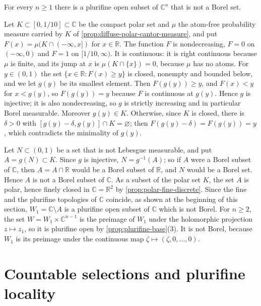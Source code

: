 \begin{example}\label{ex:non-borel-plurifine-open}
For every $n\ge1$ there is a plurifine open subset of $\mathbb C^n$ that is not a Borel set.

Let $K\subset[0,1/10]\subset\mathbb C$ be the compact polar set and $\mu$ the atom-free probability measure carried by $K$ of \cref{prop:diffuse-polar-cantor-measure}, and put $F(x)=\mu(K\cap(-\infty,x])$ for $x\in\mathbb R$. The function $F$ is nondecreasing, $F=0$ on $(-\infty,0)$ and $F=1$ on $[1/10,\infty)$. It is continuous: it is right continuous because $\mu$ is finite, and its jump at $x$ is $\mu(K\cap\{x\})=0$, because $\mu$ has no atoms. For $y\in(0,1)$ the set $\{x\in\mathbb R:F(x)\ge y\}$ is closed, nonempty and bounded below, and we let $g(y)$ be its smallest element. Then $F(g(y))\ge y$, and $F(x)<y$ for $x<g(y)$, so $F(g(y))=y$ because $F$ is continuous at $g(y)$. Hence $g$ is injective; it is also nondecreasing, so $g$ is strictly increasing and in particular Borel measurable. Moreover $g(y)\in K$. Otherwise, since $K$ is closed, there is $\delta>0$ with $[g(y)-\delta,g(y)]\cap K=\varnothing$; then $F(g(y)-\delta)=F(g(y))=y$, which contradicts the minimality of $g(y)$.

Let $N\subset(0,1)$ be a set that is not Lebesgue measurable, and put $A=g(N)\subset K$. Since $g$ is injective, $N=g^{-1}(A)$; so if $A$ were a Borel subset of $\mathbb C$, then $A=A\cap\mathbb R$ would be a Borel subset of $\mathbb R$, and $N$ would be a Borel set. Hence $A$ is not a Borel subset of $\mathbb C$. As a subset of the polar set $K$, the set $A$ is polar, hence finely closed in $\mathbb C=\mathbb R^2$ by \cref{prop:polar-fine-discrete}. Since the fine and the plurifine topologies of $\mathbb C$ coincide, as shown at the beginning of this section, $W_1=\mathbb C\setminus A$ is a plurifine open subset of $\mathbb C$ which is not Borel. For $n\ge2$, the set $W=W_1\times\mathbb C^{n-1}$ is the preimage of $W_1$ under the holomorphic projection $z\mapsto z_1$, so it is plurifine open by \cref{prop:plurifine-base}(3). It is not Borel, because $W_1$ is its preimage under the continuous map $\zeta\mapsto(\zeta,0,\ldots,0)$.
\end{example}

\section{Countable selections and plurifine locality}
\label{sec:plurifine-selection-locality}

